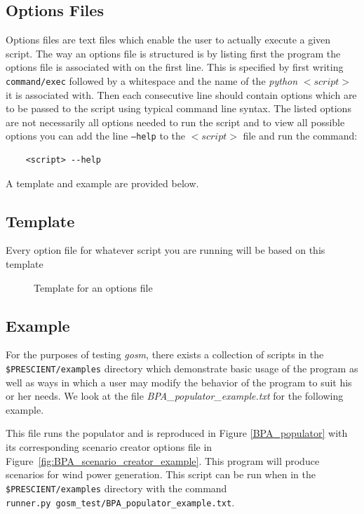 \documentclass[11pt]{article}
\begin{document}
\subsection{Options Files}\label{sec:options}
Options files are text files which enable the user to actually execute a given script. The way an options file is structured is by listing first the program the options file is associated with on the first line. This is specified by first writing \texttt{command/exec} followed by a whitespace and the name of the \textit{python} $<script>$ it is associated with. Then each consecutive line should contain options which are to be passed to the script using typical command line syntax. The listed options are not necessarily all options needed to run the script and to view all possible options you can add the line \texttt{--help} to the $<script>$ file and run the  command: 
\begin{center}
	\begin{verbatim}
	<script> --help
	\end{verbatim}
\end{center}

A template and example are provided below.

\subsection{Template}\label{sec:template}
Every option file for whatever script you are running will be based on this template
\begin{figure}[H]
	\begin{framed}
		
	\end{framed}
	\caption{Template for an options file}
	\label{fig:template_options}
\end{figure}

\subsection{Example}\label{sec:example}
For the purposes of testing \textit{gosm}, there exists a collection of scripts in the \texttt{\$PRESCIENT/examples} directory which demonstrate basic usage of the program as well as ways in which a user may modify the behavior of the program to suit his or her needs. We look at the file \textit{BPA\_populator\_example.txt} for the following example.

This file runs the populator and is reproduced in Figure \ref{BPA_populator} with its corresponding scenario creator options file in Figure~\ref{fig:BPA_scenario_creator_example}. This program will produce scenarios for wind power generation. This script can be run when in the \texttt{\$PRESCIENT/examples} directory with the command \\ \texttt{runner.py gosm\_test/BPA\_populator\_example.txt}. 
\end{document}
